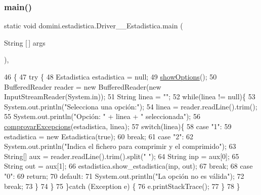 \subsubsection{\texorpdfstring{main()}{main()}}
{\footnotesize\ttfamily static void domini.\+estadistica.\+Driver\+\_\+\+\_\+\+Estadistica.\+main (\begin{DoxyParamCaption}\item[{String \mbox{[}$\,$\mbox{]}}]{args }\end{DoxyParamCaption})\hspace{0.3cm}{\ttfamily [inline]}, {\ttfamily [static]}}


\begin{DoxyCode}
46                                            \{
47     \textcolor{keywordflow}{try} \{
48         Estadistica estadistica = null;
49         \hyperlink{classdomini_1_1estadistica_1_1Driver____Estadistica_ab42f06b8996094e10bd087ccf2f749e7}{showOptions}();
50         BufferedReader reader = \textcolor{keyword}{new} BufferedReader(\textcolor{keyword}{new} InputStreamReader(System.in));
51         String linea = \textcolor{stringliteral}{""};
52         \textcolor{keywordflow}{while}(linea != null)\{
53             System.out.println(\textcolor{stringliteral}{"Selecciona una opción:"});
54             linea = reader.readLine().trim();
55             System.out.println(\textcolor{stringliteral}{"Opción: "} + linea + \textcolor{stringliteral}{" seleccionada"});
56             \hyperlink{classdomini_1_1estadistica_1_1Driver____Estadistica_a3459f11af9841b23ac81a409a3e84e22}{comprovarExcepcions}(estadistica, linea);
57             \textcolor{keywordflow}{switch}(linea)\{
58                 \textcolor{keywordflow}{case} \textcolor{stringliteral}{"1"}:
59                     estadistica = \textcolor{keyword}{new} Estadistica(\textcolor{keyword}{true});
60                 \textcolor{keywordflow}{break};
61                 \textcolor{keywordflow}{case} \textcolor{stringliteral}{"2"}:
62                     System.out.println(\textcolor{stringliteral}{"Indica el fichero para comprimir y el comprimido"});
63                     String[] aux = reader.readLine().trim().split(\textcolor{stringliteral}{" "});
64                     String inp = aux[0];
65                     String out = aux[1];
66                     estadistica.show\_estadistica(inp, out);
67                 \textcolor{keywordflow}{break};
68                 \textcolor{keywordflow}{case} \textcolor{stringliteral}{"0"}:
69                     \textcolor{keywordflow}{return};
70                 \textcolor{keywordflow}{default}:
71                     System.out.println(\textcolor{stringliteral}{"La opción no es válida"});
72                 \textcolor{keywordflow}{break};
73             \}
74         \}
75     \}\textcolor{keywordflow}{catch} (Exception e) \{
76         e.printStackTrace();
77     \}
78     \}
\end{DoxyCode}
